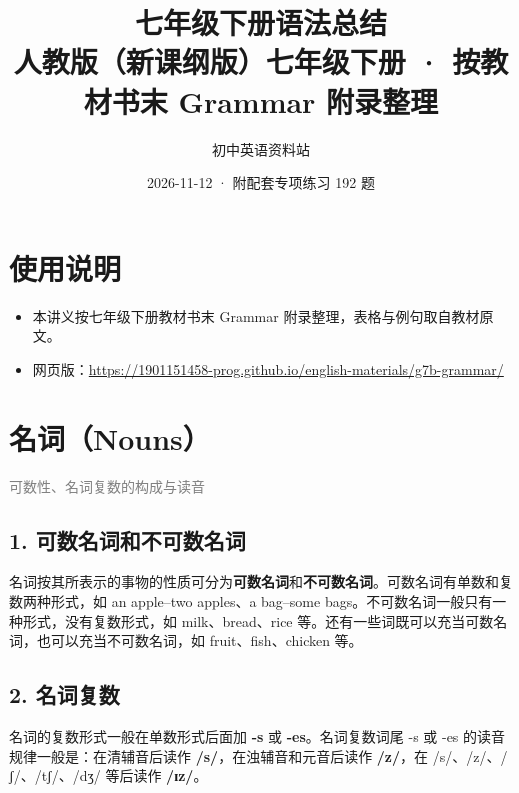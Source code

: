 \documentclass[11pt,a4paper]{ctexart}
\title{\textbf{七年级下册语法总结}\\[4pt]
\large 人教版（新课纲版）七年级下册 · 按教材书末 Grammar 附录整理}
\author{初中英语资料站}
\date{2026-11-12 · 附配套专项练习 192 题}
\begin{document}
\maketitle
\section*{使用说明}
\begin{itemize}[leftmargin=1.4em]
\item 本讲义按七年级下册教材书末 Grammar 附录整理，表格与例句取自教材原文。
\item 网页版：\url{https://1901151458-prog.github.io/english-materials/g7b-grammar/}
\end{itemize}

\section{名词（Nouns）}
\noindent\textcolor{gray}{可数性、名词复数的构成与读音}\par\smallskip
\subsection*{1. 可数名词和不可数名词}

名词按其所表示的事物的性质可分为\textbf{可数名词}和\textbf{不可数名词}。可数名词有单数和复数两种形式，如 an apple–two apples、a bag–some bags。不可数名词一般只有一种形式，没有复数形式，如 milk、bread、rice 等。还有一些词既可以充当可数名词，也可以充当不可数名词，如 fruit、fish、chicken 等。

\subsection*{2. 名词复数}

名词的复数形式一般在单数形式后面加 \textbf{-s} 或 \textbf{-es}。名词复数词尾 -s 或 -es 的读音规律一般是：在清辅音后读作 \textbf{/s/}，在浊辅音和元音后读作 \textbf{/z/}，在 /s/、/z/、/ʃ/、/tʃ/、/dʒ/ 等后读作 \textbf{/ɪz/}。
\end{document}
